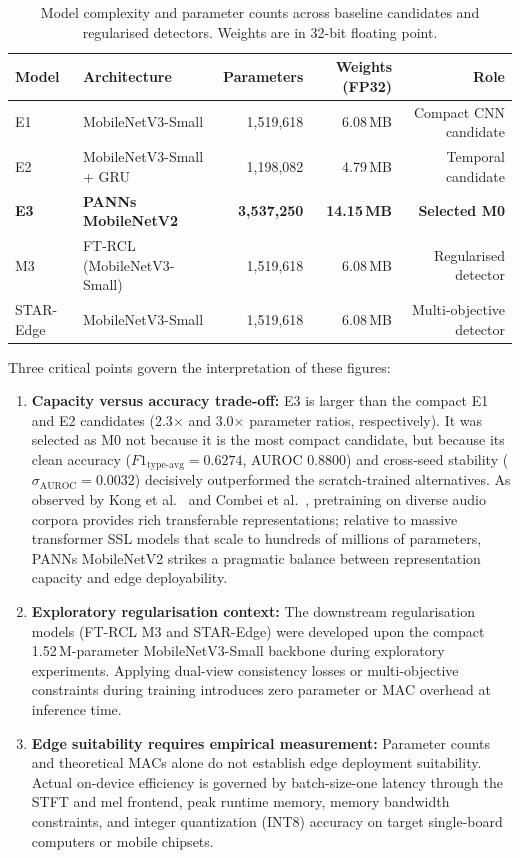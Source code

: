 \documentclass[12pt,a4paper]{report}
\begin{document}
\begin{table}[htbp]
\centering
\caption{Model complexity and parameter counts across baseline candidates and regularised detectors. Weights are in 32-bit floating point.}
\label{tab:efficiency}
\small

\begin{tabular}{@{}llrrr@{}}
\toprule
Model & Architecture & Parameters & Weights (FP32) & Role \\
\midrule
E1 & MobileNetV3-Small & 1{,}519{,}618 & 6.08\,MB & Compact CNN candidate \\
E2 & MobileNetV3-Small + GRU & 1{,}198{,}082 & 4.79\,MB & Temporal candidate \\
\textbf{E3} & \textbf{PANNs MobileNetV2} & \textbf{3{,}537{,}250} & \textbf{14.15\,MB} & \textbf{Selected M0} \\
\midrule
M3 & FT-RCL (MobileNetV3-Small) & 1{,}519{,}618 & 6.08\,MB & Regularised detector \\
STAR-Edge & MobileNetV3-Small & 1{,}519{,}618 & 6.08\,MB & Multi-objective detector \\
\bottomrule
\end{tabular}

\end{table}

Three critical points govern the interpretation of these figures:
\begin{enumerate}[label=\textbf{\arabic*.},leftmargin=*,itemsep=0.2em]
  \item \textbf{Capacity versus accuracy trade-off:} E3 is larger than the compact E1 and E2 candidates (2.3$\times$ and 3.0$\times$ parameter ratios, respectively). It was selected as M0 not because it is the most compact candidate, but because its clean accuracy ($F1_{\mathrm{type\text{-}avg}}=0.6274$, AUROC 0.8800) and cross-seed stability ($\sigma_{\mathrm{AUROC}}=0.0032$) decisively outperformed the scratch-trained alternatives. As observed by Kong et al.~\cite{kong2020panns} and Combei et al.~\cite{combei2024wavlm}, pretraining on diverse audio corpora provides rich transferable representations; relative to massive transformer SSL models that scale to hundreds of millions of parameters, PANNs MobileNetV2 strikes a pragmatic balance between representation capacity and edge deployability.
  \item \textbf{Exploratory regularisation context:} The downstream regularisation models (FT-RCL M3 and STAR-Edge) were developed upon the compact 1.52\,M-parameter MobileNetV3-Small backbone during exploratory experiments. Applying dual-view consistency losses or multi-objective constraints during training introduces zero parameter or MAC overhead at inference time.
  \item \textbf{Edge suitability requires empirical measurement:} Parameter counts and theoretical MACs alone do not establish edge deployment suitability. Actual on-device efficiency is governed by batch-size-one latency through the STFT and mel frontend, peak runtime memory, memory bandwidth constraints, and integer quantization (INT8) accuracy on target single-board computers or mobile chipsets.
\end{enumerate}
\end{document}
